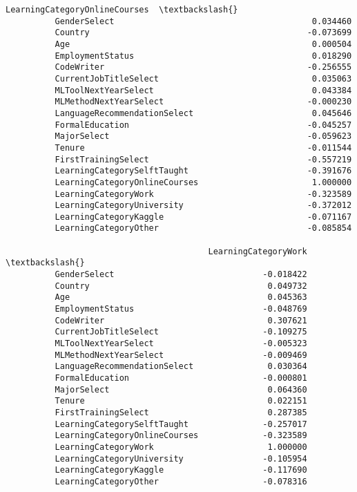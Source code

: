 \documentclass[11pt]{article}
\begin{document}
\begin{Verbatim}[commandchars=\\\{\}]
                                         LearningCategoryOnlineCourses  \textbackslash{}
          GenderSelect                                        0.034460   
          Country                                            -0.073699   
          Age                                                 0.000504   
          EmploymentStatus                                    0.018290   
          CodeWriter                                         -0.256555   
          CurrentJobTitleSelect                               0.035063   
          MLToolNextYearSelect                                0.043384   
          MLMethodNextYearSelect                             -0.000230   
          LanguageRecommendationSelect                        0.045646   
          FormalEducation                                    -0.045257   
          MajorSelect                                        -0.059623   
          Tenure                                             -0.011544   
          FirstTrainingSelect                                -0.557219   
          LearningCategorySelftTaught                        -0.391676   
          LearningCategoryOnlineCourses                       1.000000   
          LearningCategoryWork                               -0.323589   
          LearningCategoryUniversity                         -0.372012   
          LearningCategoryKaggle                             -0.071167   
          LearningCategoryOther                              -0.085854   
          
                                         LearningCategoryWork  \textbackslash{}
          GenderSelect                              -0.018422   
          Country                                    0.049732   
          Age                                        0.045363   
          EmploymentStatus                          -0.048769   
          CodeWriter                                 0.307621   
          CurrentJobTitleSelect                     -0.109275   
          MLToolNextYearSelect                      -0.005323   
          MLMethodNextYearSelect                    -0.009469   
          LanguageRecommendationSelect               0.030364   
          FormalEducation                           -0.000801   
          MajorSelect                                0.064360   
          Tenure                                     0.022151   
          FirstTrainingSelect                        0.287385   
          LearningCategorySelftTaught               -0.257017   
          LearningCategoryOnlineCourses             -0.323589   
          LearningCategoryWork                       1.000000   
          LearningCategoryUniversity                -0.105954   
          LearningCategoryKaggle                    -0.117690   
          LearningCategoryOther                     -0.078316   
          

\end{Verbatim}
\end{document}
